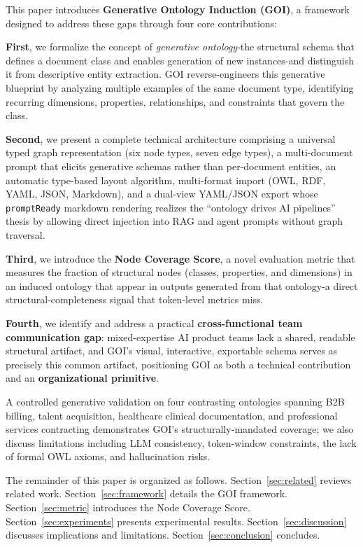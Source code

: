 \documentclass[runningheads,a4paper]{llncs}
\begin{document}
This paper introduces \textbf{Generative Ontology Induction (GOI)}, a
framework designed to address these gaps through four core contributions:

\textbf{First}, we formalize the concept of \emph{generative
ontology}-the structural schema that defines a document class and
enables generation of new instances-and distinguish it from
descriptive entity extraction. GOI reverse-engineers this generative
blueprint by analyzing multiple examples of the same document type,
identifying recurring dimensions, properties, relationships, and
constraints that govern the class.

\textbf{Second}, we present a complete technical architecture
comprising a universal typed graph representation (six node types, seven
edge types), a multi-document prompt that elicits generative schemas
rather than per-document entities, an automatic type-based layout
algorithm, multi-format import (OWL, RDF, YAML, JSON, Markdown), and a
dual-view YAML/JSON export whose \texttt{promptReady} markdown
rendering realizes the ``ontology drives AI pipelines'' thesis by
allowing direct injection into RAG and agent prompts without graph
traversal.

\textbf{Third}, we introduce the \textbf{Node Coverage Score}, a novel
evaluation metric that measures the fraction of structural nodes
(classes, properties, and dimensions) in an induced ontology that
appear in outputs generated from that ontology-a direct
structural-completeness signal that token-level metrics miss.

\textbf{Fourth}, we identify and address a practical
\textbf{cross-functional team communication gap}: mixed-expertise AI
product teams lack a shared, readable structural artifact, and GOI's
visual, interactive, exportable schema serves as precisely this common
artifact, positioning GOI as both a technical contribution and an
\textbf{organizational primitive}.

A controlled generative validation on four contrasting ontologies
spanning B2B billing, talent acquisition, healthcare clinical
documentation, and professional services contracting demonstrates
GOI's structurally-mandated coverage; we also discuss limitations
including LLM consistency, token-window constraints, the lack of
formal OWL axioms, and hallucination risks.

The remainder of this paper is organized as follows.
Section~\ref{sec:related} reviews related work.
Section~\ref{sec:framework} details the GOI framework.
Section~\ref{sec:metric} introduces the Node Coverage Score.
Section~\ref{sec:experiments} presents experimental results.
Section~\ref{sec:discussion} discusses implications and limitations.
Section~\ref{sec:conclusion} concludes.
\end{document}
